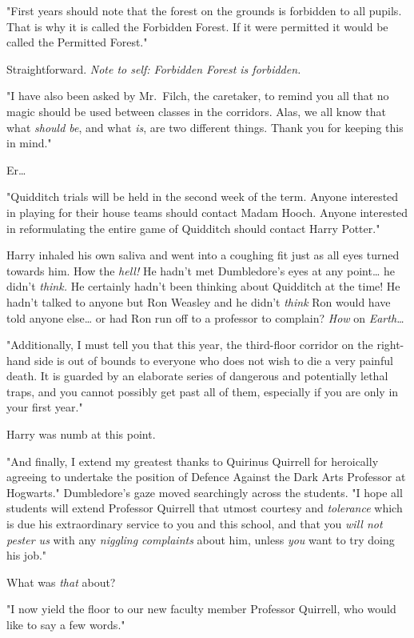 "First years should note that the forest on the grounds is forbidden to all
pupils. That is why it is called the Forbidden Forest. If it were permitted it
would be called the Permitted Forest."

Straightforward. \emph{Note to self: Forbidden Forest is forbidden.}

"I have also been asked by Mr.~Filch, the caretaker, to remind you all that no
magic should be used between classes in the corridors. Alas, we all know that
what \emph{should be}, and what \emph{is}, are two different things. Thank you
for keeping this in mind."

Er{\ldots}

"Quidditch trials will be held in the second week of the term. Anyone
interested in playing for their house teams should contact Madam Hooch. Anyone
interested in reformulating the entire game of Quidditch should contact Harry
Potter."

Harry inhaled his own saliva and went into a coughing fit just as all eyes
turned towards him. How the \emph{hell!} He hadn't met Dumbledore's eyes at any
point{\ldots} he didn't \emph{think.} He certainly hadn't been thinking about
Quidditch at the time! He hadn't talked to anyone but Ron Weasley and he didn't
\emph{think} Ron would have told anyone else{\ldots} or had Ron run off to a
professor to complain? \emph{How} on \emph{Earth{\ldots}}

"Additionally, I must tell you that this year, the third-floor corridor on the
right-hand side is out of bounds to everyone who does not wish to die a very
painful death. It is guarded by an elaborate series of dangerous and
potentially lethal traps, and you cannot possibly get past all of them,
especially if you are only in your first year."

Harry was numb at this point.

"And finally, I extend my greatest thanks to Quirinus Quirrell for heroically
agreeing to undertake the position of Defence Against the Dark Arts Professor
at Hogwarts." Dumbledore's gaze moved searchingly across the students. "I hope
all students will extend Professor Quirrell that utmost courtesy and
\emph{tolerance} which is due his extraordinary service to you and this school,
and that you \emph{will not pester us} with any \emph{niggling complaints}
about him, unless \emph{you} want to try doing his job."

What was \emph{that} about?

"I now yield the floor to our new faculty member Professor Quirrell, who would
like to say a few words."

